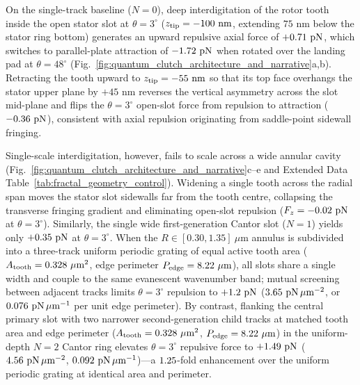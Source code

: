 \documentclass[pdflatex,sn-nature]{sn-jnl}
\DeclareRobustCommand{\roundtwo}[1]{\fpeval{round(#1,2)}}
\DeclareRobustCommand{\roundthree}[1]{\fpeval{round(#1,3)}}
\begin{document}
On the single-track baseline ($N=0$), deep interdigitation of the rotor tooth inside the open stator slot at $\theta=3^\circ$ ($z_{\rm tip} = -100\text{ nm}$, extending $75\text{ nm}$ below the stator ring bottom) generates an upward repulsive axial force of $+\roundtwo{\SingletoothTrackzeroBemThetathreeFZPn}\text{ pN}$, which switches to parallel-plate attraction of $\roundtwo{\SingletoothTrackzeroBemThetafoureightFZPn}\text{ pN}$ when rotated over the landing pad at $\theta=48^\circ$ (Fig.~\ref{fig:quantum_clutch_architecture_and_narrative}a,b). Retracting the tooth upward to $z_{\rm tip} = -55\text{ nm}$ so that its top face overhangs the stator upper plane by $+45\text{ nm}$ reverses the vertical asymmetry across the slot mid-plane and flips the $\theta=3^\circ$ open-slot force from repulsion to attraction ($\roundtwo{\SingletoothTrackzeroOverhangBemThetathreeFZPn}\text{ pN}$), consistent with axial repulsion originating from saddle-point sidewall fringing\cite{levin2010}.

Single-scale interdigitation, however, fails to scale across a wide annular cavity (Fig.~\ref{fig:quantum_clutch_architecture_and_narrative}c--e and Extended Data Table~\ref{tab:fractal_geometry_control}). Widening a single tooth across the radial span moves the stator slot sidewalls far from the tooth centre, collapsing the transverse fringing gradient and eliminating open-slot repulsion ($F_z = \roundtwo{\CtrlSinglewideBemThetathreeFZPn}\text{ pN}$ at $\theta=3^\circ$). Similarly, the single wide first-generation Cantor slot ($N=1$) yields only $+\roundtwo{\FractalNoneFundringBemThetathreeFZPn}\text{ pN}$ at $\theta=3^\circ$. When the $R \in [0.30, 1.35]\ \mu\text{m}$ annulus is subdivided into a three-track uniform periodic grating of equal active tooth area ($A_{\rm tooth} = \roundthree{\FractalCtrlUniformperiodicActiveToothAreaUmtwo}\ \mu\text{m}^2$, edge perimeter $P_{\rm edge} = \roundtwo{\FractalCtrlUniformperiodicEdgePerimeterUm}\ \mu\text{m}$), all slots share a single width and couple to the same evanescent wavenumber band; mutual screening between adjacent tracks limits $\theta=3^\circ$ repulsion to $+\roundtwo{\CtrlUniformperiodicBemThetathreeFZPn}\text{ pN}$ ($\roundtwo{\NatureCtrlUniformperiodicFRepPnPerToothAreaUmtwo}\text{ pN}\,\mu\text{m}^{-2}$, or $\roundthree{\FractalCtrlUniformperiodicFRepPnPerUm}\text{ pN}\,\mu\text{m}^{-1}$ per unit edge perimeter). By contrast, flanking the central primary slot with two narrower second-generation child tracks at matched tooth area and edge perimeter ($A_{\rm tooth} = \roundthree{\FractalCantorFlatzActiveToothAreaUmtwo}\ \mu\text{m}^2$, $P_{\rm edge} = \roundtwo{\FractalCantorFlatzEdgePerimeterUm}\ \mu\text{m}$) in the uniform-depth $N=2$ Cantor ring elevates $\theta=3^\circ$ repulsive force to $+\roundtwo{\CantorNtwoFlatzBemThetathreeFZPn}\text{ pN}$ ($\roundtwo{\NatureCantorNtwoFlatzFRepPnPerToothAreaUmtwo}\text{ pN}\,\mu\text{m}^{-2}$, $\roundthree{\FractalCantorFlatzFRepPnPerUm}\text{ pN}\,\mu\text{m}^{-1}$)---a $1.25{}$-fold enhancement over the uniform periodic grating at identical area and perimeter.
\end{document}
